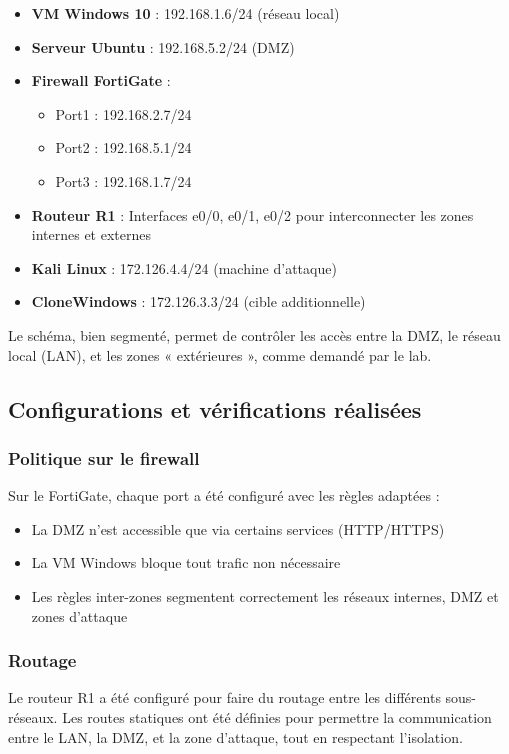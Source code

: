 \documentclass[12pt,a4paper]{article}
\begin{document}
	\begin{itemize}
		\item \textbf{VM Windows 10} : 192.168.1.6/24 (réseau local)
		\item \textbf{Serveur Ubuntu} : 192.168.5.2/24 (DMZ)
		\item \textbf{Firewall FortiGate} : 
		\begin{itemize}
			\item Port1 : 192.168.2.7/24
			\item Port2 : 192.168.5.1/24
			\item Port3 : 192.168.1.7/24
		\end{itemize}
		\item \textbf{Routeur R1} : Interfaces e0/0, e0/1, e0/2 pour interconnecter les zones internes et externes
		\item \textbf{Kali Linux} : 172.126.4.4/24 (machine d'attaque)
		\item \textbf{CloneWindows} : 172.126.3.3/24 (cible additionnelle)
	\end{itemize}
	
	Le schéma, bien segmenté, permet de contrôler les accès entre la DMZ, le réseau local (LAN), et les zones « extérieures », comme demandé par le lab.
	
	\subsection{Configurations et vérifications réalisées}
	
	\subsubsection{Politique sur le firewall}
	Sur le FortiGate, chaque port a été configuré avec les règles adaptées :
	\begin{itemize}
		\item La DMZ n'est accessible que via certains services (HTTP/HTTPS)
		\item La VM Windows bloque tout trafic non nécessaire
		\item Les règles inter-zones segmentent correctement les réseaux internes, DMZ et zones d'attaque
	\end{itemize}
	
	\subsubsection{Routage}
	Le routeur R1 a été configuré pour faire du routage entre les différents sous-réseaux. Les routes statiques ont été définies pour permettre la communication entre le LAN, la DMZ, et la zone d'attaque, tout en respectant l'isolation.
	
\end{document}
